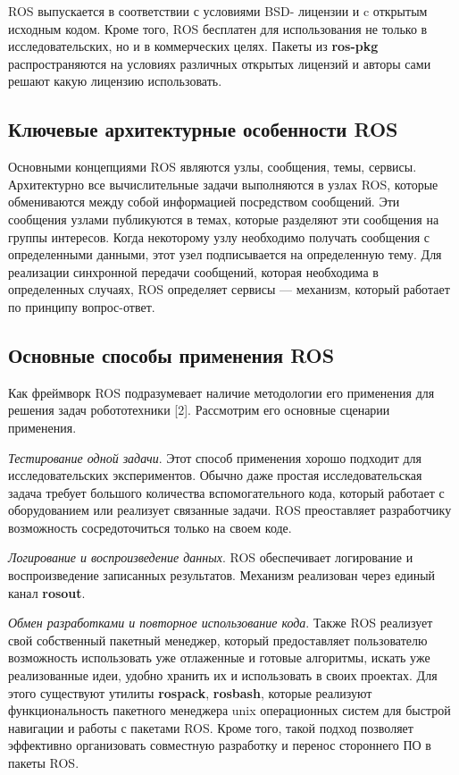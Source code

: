 \documentclass[10pt, a5paper]{article}
\begin{document}
ROS выпускается в соответствии с условиями BSD- лицензии и c открытым исходным кодом. Кроме того, ROS бесплатен для использования не только в исследовательских, но и в коммерческих целях. Пакеты из \textbf{ros-pkg} распространяются на условиях различных открытых лицензий и авторы сами решают какую лицензию использовать.

\subsection*{Ключевые архитектурные особенности ROS}

Основными концепциями ROS являются узлы, сообщения, темы, сервисы. Архитектурно все вычислительные задачи выполняются в узлах ROS, которые обмениваются между собой информацией посредством сообщений. Эти сообщения узлами публикуются в темах, которые разделяют эти сообщения на группы интересов. Когда некоторому узлу необходимо получать сообщения с определенными данными, этот узел подписывается на определенную тему. Для реализации синхронной передачи сообщений, которая необходима в определенных случаях, ROS определяет сервисы — механизм, который работает по принципу вопрос-ответ.

\subsection*{Основные способы применения ROS}

Как фреймворк ROS подразумевает наличие методологии его применения для решения задач робототехники [2]. Рассмотрим его основные сценарии применения.

\emph{Тестирование одной задачи}. Этот способ применения хорошо подходит для исследовательских экспериментов. Обычно даже простая исследовательская задача требует большого количества вспомогательного кода, который работает с оборудованием или реализует связанные задачи. ROS преоставляет разработчику возможность сосредоточиться только на своем коде.

\emph{Логирование и воспроизведение данных}. ROS обеспечивает логирование и воспроизведение записанных результатов. Механизм реализован через единый канал \textbf{rosout}.

\emph{Обмен разработками и повторное использование кода}. Также ROS реализует свой собственный пакетный менеджер, который пре\-доставляет пользователю возможность использовать уже отлаженные и готовые алгоритмы, искать уже реализованные идеи, удобно хранить их и использовать в своих проектах. Для этого существуют утилиты \textbf{rospack}, \textbf{rosbash}, которые реализуют функциональность пакетного менеджера unix операционных систем для быстрой навигации и работы с пакетами ROS. Кроме того, такой подход позволяет эффективно организовать совместную разработку и перенос стороннего ПО в пакеты ROS.
\end{document}
